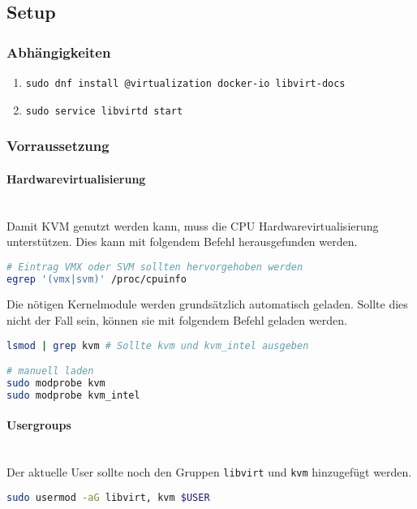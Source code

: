 \subsection{Setup}
\subsubsection{Abhängigkeiten}
\begin{enumerate}
	\item \lstinline|sudo dnf install @virtualization docker-io libvirt-docs|
	\item \lstinline|sudo service libvirtd start|
\end{enumerate}

\subsubsection{Vorraussetzung}
\paragraph{Hardwarevirtualisierung} \hfill \\
Damit KVM genutzt werden kann, muss die CPU Hardwarevirtualisierung unterstützen. Dies kann mit folgendem Befehl herausgefunden werden.
\begin{lstlisting}[language=bash]
# Eintrag VMX oder SVM sollten hervorgehoben werden
egrep '(vmx|svm)' /proc/cpuinfo
\end{lstlisting}

Die nötigen Kernelmodule werden grundsätzlich automatisch geladen. Sollte dies nicht der Fall sein, können sie mit folgendem Befehl geladen werden.
\begin{lstlisting}[language=bash]
lsmod | grep kvm # Sollte kvm und kvm_intel ausgeben 

# manuell laden
sudo modprobe kvm
sudo modprobe kvm_intel
\end{lstlisting}

\paragraph{Usergroups} \hfill \\
Der aktuelle User sollte noch den Gruppen \lstinline|libvirt| und \lstinline|kvm| hinzugefügt werden.
\begin{lstlisting}[language=bash]
sudo usermod -aG libvirt, kvm $USER
\end{lstlisting}





